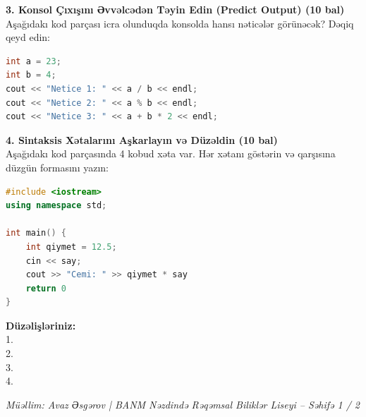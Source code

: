 \documentclass[10.5pt,a4paper]{article}
\begin{document}
\vspace{0.15cm}
\textbf{3. Konsol Çıxışını Əvvəlcədən Təyin Edin (Predict Output) (10 bal)}\\
Aşağıdakı kod parçası icra olunduqda konsolda hansı nəticələr görünəcək? Dəqiq qeyd edin:

\begin{minipage}[t]{0.52\textwidth}
\begin{lstlisting}[language=C++]
int a = 23;
int b = 4;
cout << "Netice 1: " << a / b << endl;
cout << "Netice 2: " << a % b << endl;
cout << "Netice 3: " << a + b * 2 << endl;
\end{lstlisting}
\end{minipage}
\hfill
\begin{minipage}[t]{0.44\textwidth}
\noindent{}
\end{minipage}

\vspace{0.2cm}
\textbf{4. Sintaksis Xətalarını Aşkarlayın və Düzəldin (10 bal)}\\
Aşağıdakı kod parçasında 4 kobud xəta var. Hər xətanı göstərin və qarşısına düzgün formasını yazın:

\begin{minipage}[t]{0.52\textwidth}
\begin{lstlisting}[language=C++]
#include <iostream>
using namespace std;

int main() {
    int qiymet = 12.5;
    cin << say;
    cout >> "Cemi: " >> qiymet * say
    return 0
}
\end{lstlisting}
\end{minipage}
\hfill
\begin{minipage}[t]{0.44\textwidth}
\textbf{Düzəlişləriniz:}\\[0.1cm]
1. \hrulefill\\[0.3cm]
2. \hrulefill\\[0.3cm]
3. \hrulefill\\[0.3cm]
4. \hrulefill\\[0.3cm]
\end{minipage}

\vfill
\begin{center}
\footnotesize \textit{Müəllim: Avaz Əsgərov | BANM Nəzdində Rəqəmsal Biliklər Liseyi -- Səhifə 1 / 2}
\end{center}
\end{document}
